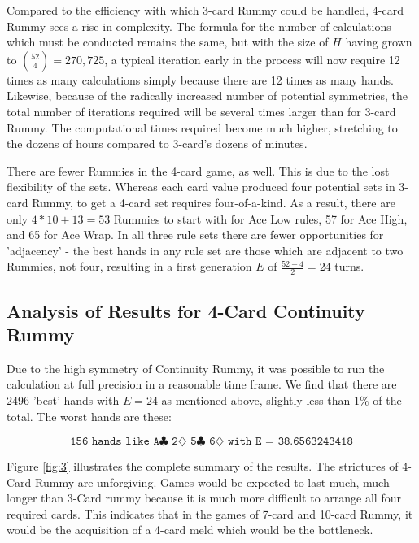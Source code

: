 \documentclass[letter,12pt]{article}
\begin{document}
Compared to the efficiency with which 3-card Rummy could be handled, 4-card Rummy sees a rise in complexity. The formula for the number of calculations which must be conducted remains the same, but with the size of $H$ having grown to $\binom{52}{4} = 270,725$, a typical iteration early in the process will now require 12 times as many calculations simply because there are 12 times as many hands. Likewise, because of the radically increased number of potential symmetries, the total number of iterations required will be several times larger than for 3-card Rummy. The computational times required become much higher, stretching to the dozens of hours compared to 3-card's dozens of minutes.

There are fewer Rummies in the 4-card game, as well. This is due to the lost flexibility of the sets. Whereas each card value produced four potential sets in 3-card Rummy, to get a 4-card set requires four-of-a-kind. As a result, there are only $4*10 + 13 = 53$ Rummies to start with for Ace Low rules, 57 for Ace High, and 65 for Ace Wrap. In all three rule sets there are fewer opportunities for 'adjacency' - the best hands in any rule set are those which are adjacent to two Rummies, not four, resulting in a first generation $E$ of $\frac{52-4}{2} = 24$ turns.

\subsection{Analysis of Results for 4-Card Continuity Rummy}

Due to the high symmetry of Continuity Rummy, it was possible to run the calculation at full precision in a reasonable time frame. We find that there are 2496 'best' hands with $E=24$ as mentioned above, slightly less than 1$\%$ of the total. The worst hands are these:

$$\texttt{156 hands like A$\clubsuit$ 2$\diamondsuit$ 5$\clubsuit$ 6$\diamondsuit$ with E = 38.6563243418}$$

Figure \ref{fig:3} illustrates the complete summary of the results. The strictures of 4-Card Rummy are unforgiving. Games would be expected to last much, much longer than 3-Card rummy because it is much more difficult to arrange all four required cards. This indicates that in the games of 7-card and 10-card Rummy, it would be the acquisition of a 4-card meld which would be the bottleneck.
\end{document}
